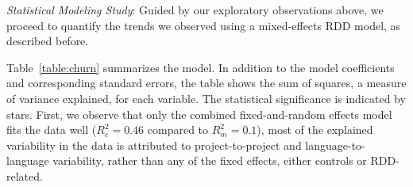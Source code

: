 

%



\smallskip\noindent \emph{Statistical Modeling Study}: 
Guided by our exploratory observations above, we proceed to quantify the 
trends we observed using a mixed-effects RDD model, as described before.

Table~\ref{table:churn} summarizes the model.
In addition to the model coefficients and corresponding standard errors, the table 
shows the sum of squares, a measure of variance explained, for each variable.
The statistical significance is indicated by stars.
First, we observe that only the combined fixed-and-random effects model fits the 
data well ($R_c^2 = 0.46$ compared to $R_m^2 = 0.1$), \ie most of the explained 
variability in the data is attributed to project-to-project and language-to-language
variability, rather than any of the fixed effects, either controls or RDD-related.

